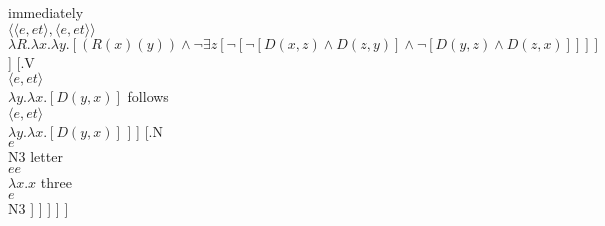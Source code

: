 \documentclass{article}
\begin{document}
{immediately\\$\langle \langle e,et\rangle ,\langle e,et\rangle \rangle $\\
$\lambda R.\lambda x.\lambda y.[(R(x) (y)) \land \lnot\exists z [\lnot[\lnot[D(x,z) \land D(z,y)] \land \lnot[D(y,z) \land D(z,x)]]]]$
 } ]  
[.{V\\
$\langle e,et\rangle $
\\
$\lambda y.\lambda x.[D(y,x)]$
}  
{follows\\$\langle e,et\rangle $\\
$\lambda y.\lambda x.[D(y,x)]$
 } ]  ]  
[.{N\\
$e$
\\
$\mbox{N3}$
}  
{letter\\$ee$\\
$\lambda x.x$
 } 
{three\\$e$\\
$\mbox{N3}$
 } ]  ]  ]  ]  ] 
\end{document}
